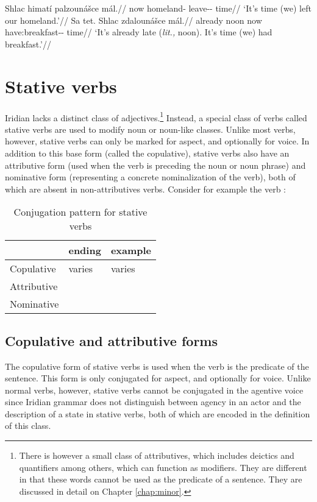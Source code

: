 \pex
\begingl
\gla Shlac himatí palzounášce mál.//
\glb now homeland-\Gen{} leave-\Lv{}-\SupN{} time//
\glft `It's time (we) left our homeland.'//
\endgl
\xe
\pex
\begingl
\gla Sa tet. Shlac zdalounášce mál.//
\glb already noon now have:breakfast-\Lv{}-\SupN{} time//
\glft `It's already late (\emph{lit.,} noon). It's time (we) had breakfast.'//
\endgl
\xe

\section{Stative verbs}\label{sec:statives}

Iridian lacks a distinct class of adjectives.\footnote{There is however a small class of attributives, which includes deictics and quantifiers among others, which can function as modifiers. They are different in that these words cannot be used as the predicate of a sentence. They are discussed in detail on Chapter \ref{chap:minor}.} Instead, a special class of verbs called {\sc stative verbs} are used to modify noun or noun-like classes. Unlike most verbs, however, stative verbs can only be marked for aspect, and optionally for voice. In addition to this base form (called the {\sc copulative}), stative verbs also have an {\sc attributive} form (used when the verb is preceding the noun or noun phrase) and {\sc nominative} form (representing a concrete nominalization of the verb), both of which are absent in non-attributives verbs. Consider for example the verb  :

\begin{table}[h!]
	\small
	\caption{Conjugation pattern for stative verbs}
	\medskip
	\begin{tabu} to 0.7\textwidth{YY[0.8]Y}
		\toprule
		&{\sc ending}&{\sc example}\\
		\midrule
		Copulative & varies & varies\\
		Attributive &  & \\
		Nominative & 	& \\
		\bottomrule
	\end{tabu}
\end{table}

\subsection{Copulative and attributive forms}
The copulative form of stative verbs is used when the verb is the predicate of the sentence. This form is only conjugated for aspect, and optionally for voice. Unlike normal verbs, however, stative verbs cannot be conjugated in the agentive voice since Iridian grammar does not distinguish between agency in an actor and the description of a state in stative verbs, both of which are encoded in the definition of this class. 

